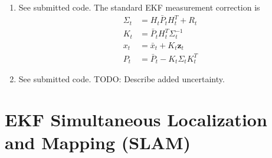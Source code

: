 \documentclass[12pt]{article}
\begin{document}
\begin{enumerate}
\[\begin{array}{c}
			\vdots \\
			H_t^K
		\end{array}\right).
	\]
	\item See submitted code. The standard EKF measurement correction is
	\begin{align*}
		\Sigma_t &= H_t \bar P_t H_t^T + R_t \\
		K_t &= \bar P_t H_t^T \Sigma_t^{-1} \\
		x_t &= \bar x_t + K_t \mathbf{z}_t \\
		P_t &= \bar P_t - K_t \Sigma_t K_t^T
	\end{align*}
	\item See submitted code. TODO: Describe added uncertainty.
\end{enumerate}

\section{EKF Simultaneous Localization and Mapping (SLAM)}
\end{document}
